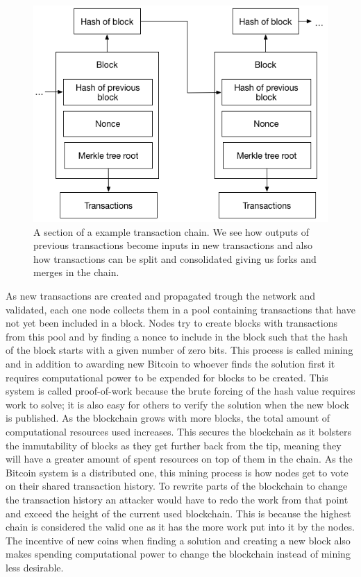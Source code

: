 \begin{figure}[h]  %
  \centering
  \includegraphics[width=.7\textwidth]{figures/blockchain}
  \caption[Transaction chain]{A section of a example transaction chain. We see how outputs of previous transactions become inputs in new transactions and also how transactions can be split and consolidated giving us forks and merges in the chain.}
  \label{fig:blockchain}
\end{figure}

As new transactions are created and propagated trough the network and validated, each one node collects them in a pool containing transactions that have not yet been included in a block. Nodes try to create blocks with transactions from this pool and by finding a nonce to include in the block such that the hash of the block starts with a given number of zero bits. This process is called mining and in addition to awarding new Bitcoin to whoever finds the solution first it requires computational power to be expended for blocks to be created. This system is called proof-of-work because the brute forcing of the hash value requires work to solve; it is also easy for others to verify the solution when the new block is published. As the blockchain grows with more blocks, the total amount of computational resources used increases. This secures the blockchain as it bolsters the immutability of blocks as they get further back from the tip, meaning they will have a greater amount of spent resources on top of them in the chain. As the Bitcoin system is a distributed one, this mining process is how nodes get to vote on their shared transaction history.
To rewrite parts of the blockchain to change the transaction history an attacker would have to redo the work from that point and exceed the height of the current used blockchain. This is because the highest chain is considered the valid one as it has the more work put into it by the nodes. The incentive of new coins when finding a solution and creating a new block also makes spending computational power to change the blockchain instead of mining less desirable. 


